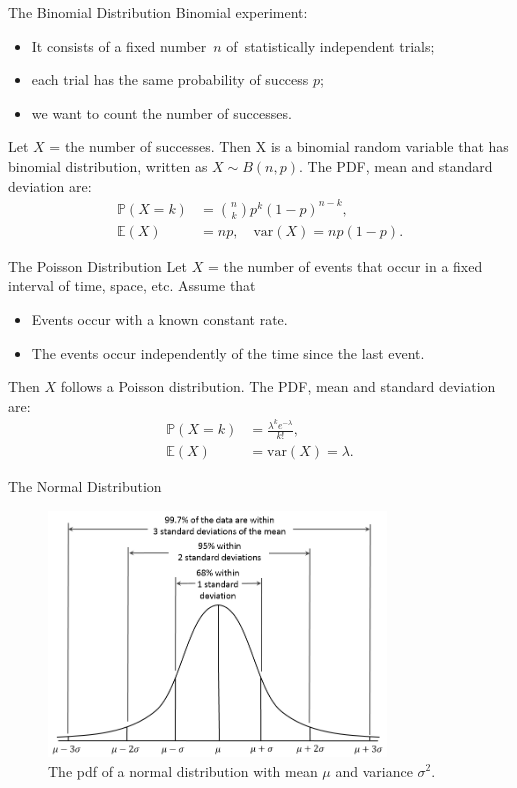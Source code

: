 \documentclass{beamer}
\newcommand{\pr}{\mathbb{P}}
\newcommand{\E}{\mathbb{E}}
\newcommand{\var}{\text{var}}
\begin{document}
\begin{frame}{The Binomial Distribution}
Binomial experiment:
\begin{itemize}
\item It consists of a fixed number \alert{$n$} of statistically independent trials;
\item each trial has the same probability of success \alert{$p$};
\item we want to count the number of successes.  
\end{itemize}

Let $X$ = the number of successes. Then X is a \alert{binomial random variable} that has \alert{binomial distribution}, 
written as $X \sim B(n,p)$. The PDF, mean and standard deviation are:
    \begin{align*}
        \pr(X=k) &= \binom{n}{k} p^k (1-p)^{n-k},\\
        \E(X)&=np, \quad \var(X) = np(1-p).
\end{align*}
\end{frame}

\begin{frame}{The Poisson Distribution}
Let $X$ = the number of events that occur in a fixed interval of time, space, etc.  Assume that
\begin{itemize}
\item Events occur with a known constant rate.
\item The events occur independently of the time since the last event.
\end{itemize}

Then $X$ follows a \alert{Poisson distribution}. The PDF, mean and standard deviation are:
\begin{align*}
    \pr(X=k)&=\frac{\lambda^k e^{-\lambda}}{k!},\\
    \E(X)&=\var(X)=\lambda.
\end{align*}
\end{frame}


\begin{frame}{The Normal Distribution}
\begin{figure}
    \caption{The pdf of a normal distribution with mean $\mu$ and variance $\sigma^2$.}
    \includegraphics[width=0.8\textwidth]{figures/normal_pdf.png}
\end{figure}
\end{frame}
\end{document}
